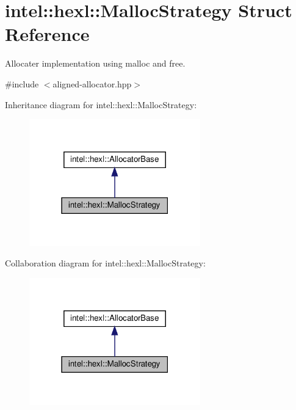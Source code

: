 \hypertarget{structintel_1_1hexl_1_1MallocStrategy}{}\section{intel\+:\+:hexl\+:\+:Malloc\+Strategy Struct Reference}
\label{structintel_1_1hexl_1_1MallocStrategy}


Allocater implementation using malloc and free.  




{\ttfamily \#include $<$aligned-\/allocator.\+hpp$>$}



Inheritance diagram for intel\+:\+:hexl\+:\+:Malloc\+Strategy\+:
\nopagebreak
\begin{figure}[H]
\begin{center}
\leavevmode
\includegraphics[width=210pt]{structintel_1_1hexl_1_1MallocStrategy__inherit__graph}
\end{center}
\end{figure}


Collaboration diagram for intel\+:\+:hexl\+:\+:Malloc\+Strategy\+:
\nopagebreak
\begin{figure}[H]
\begin{center}
\leavevmode
\includegraphics[width=210pt]{structintel_1_1hexl_1_1MallocStrategy__coll__graph}
\end{center}
\end{figure}
